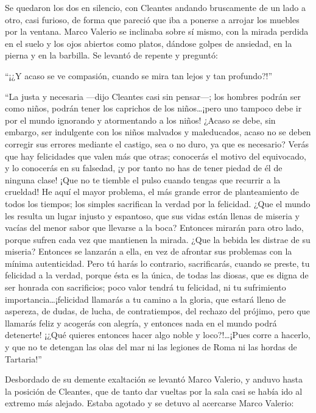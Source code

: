 \documentclass[11pt,openany]{book}
\begin{document}
Se quedaron los dos en silencio, con Cleantes andando bruscamente de un lado a otro, casi furioso, de forma que pareció que iba a ponerse a arrojar los muebles por la ventana. Marco Valerio se inclinaba sobre sí mismo, con la mirada perdida en el suelo y los ojos abiertos como platos, dándose golpes de ansiedad, en la pierna y en la barbilla. Se levantó de repente y preguntó: 

“¡¿Y acaso se ve compasión, cuando se mira tan lejos y tan profundo?!” 

“La justa y necesaria —dijo Cleantes casi sin pensar—; los hombres podrán ser como niños, podrán tener los caprichos de los niños\dots ¡pero uno tampoco debe ir por el mundo ignorando y atormentando a los niños! ¿Acaso se debe, sin embargo, ser indulgente con los niños malvados y maleducados, acaso no se deben corregir sus errores mediante el castigo, sea o no duro, ya que es necesario? Verás que hay felicidades que valen más que otras; conocerás el motivo del equivocado, y lo conocerás en su falsedad, ¡y por tanto no has de tener piedad de él de ninguna clase! ¡Que no te tiemble el pulso cuando tengas que recurrir a la crueldad! He aquí el mayor problema, el más grande error de planteamiento de todos los tiempos; los simples sacrifican la verdad por la felicidad. ¿Que el mundo les resulta un lugar injusto y espantoso, que sus vidas están llenas de miseria y vacías del menor sabor que llevarse a la boca? Entonces mirarán para otro lado, porque sufren cada vez que mantienen la mirada. ¿Que la bebida les distrae de su miseria? Entonces se lanzarán a ella, en vez de afrontar sus problemas con la mínima autenticidad. Pero tú harás lo contrario, sacrificarás, cuando se preste, tu felicidad a la verdad, porque ésta es la única, de todas las diosas, que es digna de ser honrada con sacrificios; poco valor tendrá tu felicidad, ni tu sufrimiento importancia\dots ¡felicidad llamarás a tu camino a la gloria, que estará lleno de aspereza, de dudas, de lucha, de contratiempos, del rechazo del prójimo, pero que llamarás feliz y acogerás con alegría, y entonces nada en el mundo podrá detenerte! ¡¿Qué quieres entonces hacer algo noble y loco?!\dots ¡Pues corre a hacerlo, y que no te detengan las olas del mar ni las legiones de Roma ni las hordas de Tartaria!” 

Desbordado de su demente exaltación se levantó Marco Valerio, y anduvo hasta la posición de Cleantes, que de tanto dar vueltas por la sala casi se había ido al extremo más alejado. Estaba agotado y se detuvo al acercarse Marco Valerio: 
\end{document}
